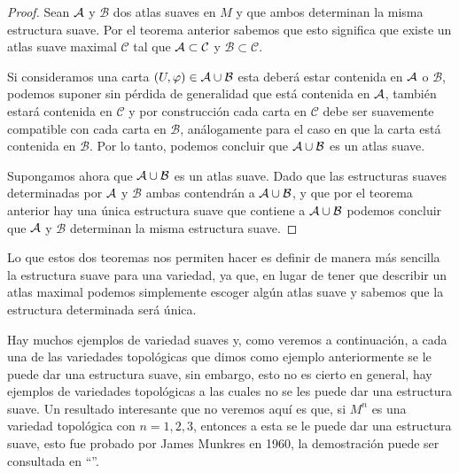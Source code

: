 \begin{proof}
	Sean $\mathcal{A}$ y $\mathcal{B}$ dos atlas suaves en $M$ y que ambos determinan la misma estructura suave. Por el teorema anterior sabemos que esto significa que existe un atlas suave maximal $\mathcal{C}$ tal que $\mathcal{A} \subset \mathcal{C}$ y $\mathcal{B} \subset \mathcal{C}$.

	Si consideramos una carta $(U,\varphi) \in \mathcal{A} \cup \mathcal{B}$ esta deberá estar contenida en $\mathcal{A}$ o $\mathcal{B}$, podemos suponer sin pérdida de generalidad que está contenida en $\mathcal{A}$, también estará contenida en $\mathcal{C}$ y por construcción cada carta en $\mathcal{C}$ debe ser suavemente compatible con cada carta en $\mathcal{B}$, análogamente para el caso en que la carta está contenida en $\mathcal{B}$. Por lo tanto, podemos concluir que $\mathcal{A} \cup \mathcal{B}$ es un atlas suave.

	Supongamos ahora que $\mathcal{A} \cup \mathcal{B}$ es un atlas suave. Dado que las estructuras suaves determinadas por $\mathcal{A}$ y $\mathcal{B}$ ambas contendrán a $\mathcal{A} \cup \mathcal{B}$, y que por el teorema anterior hay una única estructura suave que contiene a $\mathcal{A} \cup \mathcal{B}$ podemos concluir que $\mathcal{A}$ y $\mathcal{B}$ determinan la misma estructura suave.
\end{proof}

Lo que estos dos teoremas nos permiten hacer es definir de manera más sencilla la estructura suave para una variedad, ya que, en lugar de tener que describir un atlas maximal podemos simplemente escoger algún atlas suave y sabemos que la estructura determinada será única.

Hay muchos ejemplos de variedad suaves y, como veremos a continuación, a cada una de las variedades topológicas que dimos como ejemplo anteriormente se le puede dar una estructura suave, sin embargo, esto no es cierto en general, hay ejemplos de variedades topológicas a las cuales no se les puede dar una estructura suave. Un resultado interesante que no veremos aquí es que, si $M^n$ es una variedad topológica con $n=1,2,3$, entonces a esta se le puede dar una estructura suave, esto fue probado por James Munkres en 1960, la demostración puede ser consultada en \enquote{\textcite{munkres1960obstructions}}.


